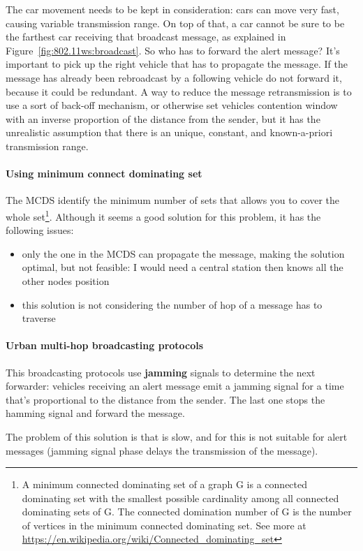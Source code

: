 The car movement needs to be kept in consideration: cars can move very fast,
causing variable transmission range. On top of that, a car cannot be sure to
be the farthest car receiving that broadcast message, as explained in
Figure~\ref{fig:802.11ws:broadcast}. So who has to forward the alert message?
It's important to pick up the right vehicle that has to propagate the message.
If the message has already been rebroadcast by a following vehicle do not
forward it, because it could be redundant. A way to reduce the message
retransmission is to use a sort of back-off mechanism, or otherwise set vehicles
contention window with an inverse proportion of the distance from the sender,
but it has the unrealistic assumption that there is an unique, constant, and
known-a-priori transmission range.

\paragraph*{Using minimum connect dominating set} The MCDS identify the minimum
number of sets that allows you to cover the whole set\footnote{A minimum
  connected dominating set of a graph G is a connected dominating set with the
  smallest possible cardinality among all connected dominating sets of G. The
  connected domination number of G is the number of vertices in the minimum
  connected dominating set. See more at
  \url{https://en.wikipedia.org/wiki/Connected_dominating_set}
}.
Although it seems a good solution for this problem, it has the following
issues:
\begin{itemize}
\item only the one in the MCDS can propagate the message, making the solution
  optimal, but not feasible: I would need a central station then knows all the
  other nodes position
\item this solution is not considering the number of hop of a message has to
  traverse
\end{itemize}

\paragraph*{Urban multi-hop broadcasting protocols} This broadcasting protocols
use \textbf{jamming} signals to determine the next forwarder: vehicles receiving
an alert message emit a jamming signal for a time that's proportional to the
distance from the sender. The last one stops the hamming signal and forward the
message.

The problem of this solution is that is slow, and for this is not suitable for
alert messages (jamming signal phase delays the transmission of the message).
